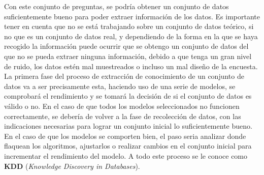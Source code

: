 Con este conjunto de preguntas, se podría obtener un conjunto de datos suficientemente bueno para poder extraer información de los datos. Es importante tener en cuenta que no se está trabajando sobre un conjunto de datos teórico, si no que es un conjunto de datos real, y dependiendo de la forma en la que se haya recogido la información puede ocurrir que se obtengo un conjunto de datos del que no se pueda extraer ninguna información, debido a que tenga un gran nivel de ruido, los datos estén mal muestreados o incluso un mal diseño de la encuesta.\\
\linebreak
 La primera fase del proceso de extracción de conocimiento de un conjunto de datos va a ser precisamente esta, haciendo uso de una serie de modelos, se comprobará el rendimiento y se tomará la decisión de si el conjunto de datos es válido o no. En el caso de que todos los modelos seleccionados no funcionen correctamente, se debería de volver a la fase de recolección de datos, con las indicaciones necesarias para lograr un conjunto inicial lo suficientemente bueno. \\
 \linebreak
 En el caso de que los modelos se comporten bien, el paso seria analizar donde flaquean los algoritmos,  ajustarlos o realizar cambios en el conjunto inicial para incrementar el rendimiento del modelo. A todo este proceso se le conoce como \textbf{KDD} (\textit{Knowledge Discovery in Databases}).